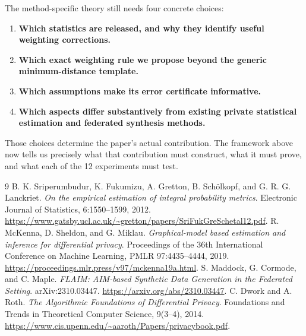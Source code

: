 \documentclass[11pt,a4paper]{article}
\begin{document}
\normalsize
The method-specific theory still needs four concrete choices:
\begin{enumerate}
\item \textbf{Which statistics are released, and why they identify useful weighting corrections.}
\item \textbf{Which exact weighting rule we propose beyond the generic minimum-distance template.}
\item \textbf{Which assumptions make its error certificate informative.}
\item \textbf{Which aspects differ substantively from existing private statistical estimation and federated synthesis methods.}
\end{enumerate}
Those choices determine the paper's actual contribution. The framework above now tells us precisely what that contribution must construct, what it must prove, and what each of the 12 experiments must test.

\begin{thebibliography}{9}
 B. K. Sriperumbudur, K. Fukumizu, A. Gretton, B. Sch\"olkopf, and G. R. G. Lanckriet.
\textit{On the empirical estimation of integral probability metrics}.
Electronic Journal of Statistics, 6:1550--1599, 2012.
\url{https://www.gatsby.ucl.ac.uk/~gretton/papers/SriFukGreSchetal12.pdf}.
 R. McKenna, D. Sheldon, and G. Miklau.
\textit{Graphical-model based estimation and inference for differential privacy}.
Proceedings of the 36th International Conference on Machine Learning, PMLR 97:4435--4444, 2019.
\url{https://proceedings.mlr.press/v97/mckenna19a.html}.
 S. Maddock, G. Cormode, and C. Maple.
\textit{FLAIM: AIM-based Synthetic Data Generation in the Federated Setting}.
arXiv:2310.03447.
\url{https://arxiv.org/abs/2310.03447}.
 C. Dwork and A. Roth.
\textit{The Algorithmic Foundations of Differential Privacy}.
Foundations and Trends in Theoretical Computer Science, 9(3--4), 2014.
\url{https://www.cis.upenn.edu/~aaroth/Papers/privacybook.pdf}.
\end{thebibliography}
\end{document}
